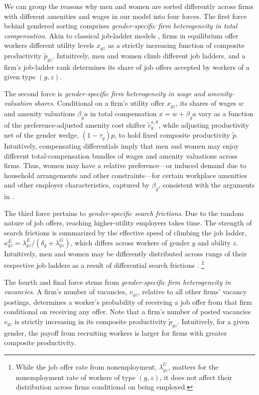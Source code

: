 We can group the reasons why men and women are sorted differently across firms with different amenities and wages in our model into four forces.
%
The first force behind gendered sorting comprises \emph{gender-specific firm heterogeneity in total compensation}. Akin to classical job-ladder models \citep{BurdettMortensen1998, BontempsRobinvandenBerg1999, BontempsRobinvandenBerg2000}, firms in equilibrium offer workers different utility levels $x_{gz}$ as a strictly increasing function of composite productivity $\tilde{p}_{gz}$. Intuitively, men and women climb different job ladders, and a firm's job-ladder rank determines its share of job offers accepted by workers of a given type $(g, z)$. %
%

The second force is \emph{gender-specific firm heterogeneity in wage and amenity-valuation shares}. Conditional on a firm's utility offer $x_{gz}$, its shares of wages $w$ and amenity valuations $\beta_{g} a$ in total compensation $x = w + \beta_{g} a$ vary as a function of the preference-adjusted amenity cost shifter $\tilde{c}_{g}^{a,0}$, while adjusting productivity net of the gender wedge, $(1-\tau_{g})p$, to hold fixed composite productivity $\tilde{p}$. Intuitively, compensating differentials imply that men and women may enjoy different total-compensation bundles of wages and amenity valuations across firms. Thus, women may have a relative preference---or induced demand due to household arrangements and other constraints---for certain workplace amenities and other employer characteristics, captured by $\beta_{g}$, consistent with the arguments in \citet{Goldin2014, Goldin2024}. %
%

The third force pertains to \emph{gender-specific search frictions}. Due to the random nature of job offers, reaching higher-utility employers takes time. The strength of search frictions is summarized by the effective speed of climbing the job ladder, $\kappa_{gz}^{E} = \lambda_{gz}^{E}/(\delta_{g} + \lambda_{gz}^{G})$, which differs across workers of gender $g$ and ability $z$. Intuitively, men and women may be differently distributed across rungs of their respective job ladders as a result of differential search frictions \citep{Bowlus1997}.%
%
\footnote{While the job offer rate from nonemployment, $\lambda_{gz}^{U}$, matters for the nonemployment rate of workers of type $(g, z)$, it does not affect their distribution across firms conditional on being employed.} %
%

The fourth and final force stems from \emph{gender-specific firm heterogeneity in vacancies}. A firm's number of vacancies, $v_{gz}$, relative to all other firms' vacancy postings, determines a worker's probability of receiving a job offer from that firm conditional on receiving any offer. Note that a firm's number of posted vacancies $v_{gz}$ is strictly increasing in its composite productivity $\tilde{p}_{gz}$. Intuitively, for a given gender, the payoff from recruiting workers is larger for firms with greater composite productivity.


